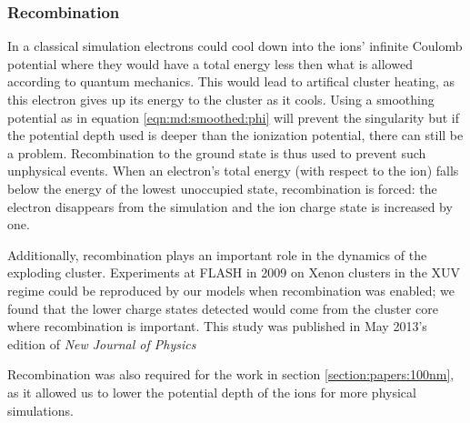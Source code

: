 
\subsubsection{Recombination}

In a classical simulation electrons could cool down into the ions' infinite Coulomb
potential where they would have a total energy less then what is allowed
according to quantum mechanics. This would lead to artifical cluster heating, as this electron gives up its energy to the cluster as it cools.
%
Using a smoothing potential as in equation
\eqref{eqn:md:smoothed:phi} will prevent the singularity but if the potential
depth used is deeper than the ionization potential, there can still be a problem.
Recombination to the ground state is thus used to prevent such unphysical events. When an electron's
total energy (with respect to the ion) falls below the energy of the lowest unoccupied state,
recombination is forced: the electron disappears from the simulation and the ion
charge state is increased by one.

Additionally, recombination plays an important role in the dynamics of the
exploding cluster. Experiments at FLASH in 2009 on Xenon clusters in the XUV
regime\cite{Thomas2009} could be reproduced by our models when recombination
was enabled; we found that the lower charge states detected would come from the
cluster core where recombination is important. This study was published in
May 2013's edition of \textit{New Journal of Physics}\cite{Ackad2013}


Recombination was also required for the work in section
\ref{section:papers:100nm}, as it allowed us to lower the potential depth of the
ions for more physical simulations.


